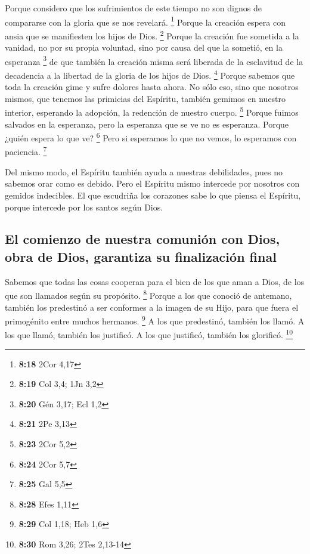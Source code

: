 \begin{paracol}{2}
 Porque considero que los sufrimientos de este tiempo no
son dignos de compararse con la gloria que se nos revelará. \footnote{\textbf{8:18}
  2Cor 4,17}  Porque la creación espera con ansia que se
manifiesten los hijos de Dios. \footnote{\textbf{8:19} Col 3,4; 1Jn 3,2}
 Porque la creación fue sometida a la vanidad, no por su
propia voluntad, sino por causa del que la sometió, en la esperanza
\footnote{\textbf{8:20} Gén 3,17; Ecl 1,2}  de que
también la creación misma será liberada de la esclavitud de la
decadencia a la libertad de la gloria de los hijos de Dios. \footnote{\textbf{8:21}
  2Pe 3,13}  Porque sabemos que toda la creación gime y
sufre dolores hasta ahora.  No sólo eso, sino que
nosotros mismos, que tenemos las primicias del Espíritu, también gemimos
en nuestro interior, esperando la adopción, la redención de nuestro
cuerpo. \footnote{\textbf{8:23} 2Cor 5,2}  Porque fuimos
salvados en la esperanza, pero la esperanza que se ve no es esperanza.
Porque ¿quién espera lo que ve? \footnote{\textbf{8:24} 2Cor 5,7}
 Pero si esperamos lo que no vemos, lo esperamos con
paciencia. \footnote{\textbf{8:25} Gal 5,5}

 Del mismo modo, el Espíritu también ayuda a nuestras
debilidades, pues no sabemos orar como es debido. Pero el Espíritu mismo
intercede por nosotros con gemidos indecibles.  El que
escudriña los corazones sabe lo que piensa el Espíritu, porque intercede
por los santos según Dios.

\hypertarget{el-comienzo-de-nuestra-comuniuxf3n-con-dios-obra-de-dios-garantiza-su-finalizaciuxf3n-final}{%
\subsection{El comienzo de nuestra comunión con Dios, obra de Dios,
garantiza su finalización
final}\label{el-comienzo-de-nuestra-comuniuxf3n-con-dios-obra-de-dios-garantiza-su-finalizaciuxf3n-final}}

 Sabemos que todas las cosas cooperan para el bien de los
que aman a Dios, de los que son llamados según su propósito. \footnote{\textbf{8:28}
  Efes 1,11}  Porque a los que conoció de antemano,
también los predestinó a ser conformes a la imagen de su Hijo, para que
fuera el primogénito entre muchos hermanos. \footnote{\textbf{8:29} Col
  1,18; Heb 1,6}  A los que predestinó, también los
llamó. A los que llamó, también los justificó. A los que justificó,
también los glorificó. \footnote{\textbf{8:30} Rom 3,26; 2Tes 2,13-14}


\end{paracol}
